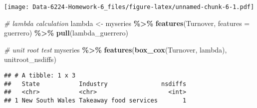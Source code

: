 \documentclass[
]{article}
\newenvironment{Shaded}{\begin{snugshade}}{\end{snugshade}}
\newcommand{\AttributeTok}[1]{\textcolor[rgb]{0.13,0.29,0.53}{#1}}
\newcommand{\CommentTok}[1]{\textcolor[rgb]{0.56,0.35,0.01}{\textit{#1}}}
\newcommand{\DecValTok}[1]{\textcolor[rgb]{0.00,0.00,0.81}{#1}}
\newcommand{\FunctionTok}[1]{\textcolor[rgb]{0.13,0.29,0.53}{\textbf{#1}}}
\newcommand{\NormalTok}[1]{#1}
\newcommand{\OtherTok}[1]{\textcolor[rgb]{0.56,0.35,0.01}{#1}}
\newcommand{\SpecialCharTok}[1]{\textcolor[rgb]{0.81,0.36,0.00}{\textbf{#1}}}
\newcommand{\StringTok}[1]{\textcolor[rgb]{0.31,0.60,0.02}{#1}}
\begin{document}
\begin{Shaded}
\end{Shaded}

\texttt{[image: Data-6224-Homework-6\_files/figure-latex/unnamed-chunk-6-1.pdf]}

\begin{Shaded}
\begin{Highlighting}[]
\CommentTok{\# lambda calculation}
\NormalTok{lambda }\OtherTok{\textless{}{-}}\NormalTok{ myseries }\SpecialCharTok{\%\textgreater{}\%}
  \FunctionTok{features}\NormalTok{(Turnover, }\AttributeTok{features =}\NormalTok{ guerrero) }\SpecialCharTok{\%\textgreater{}\%}
  \FunctionTok{pull}\NormalTok{(lambda\_guerrero)}

\CommentTok{\# unit root test}
\NormalTok{myseries }\SpecialCharTok{\%\textgreater{}\%}
  \FunctionTok{features}\NormalTok{(}\FunctionTok{box\_cox}\NormalTok{(Turnover, lambda), unitroot\_nsdiffs) }
\end{Highlighting}
\end{Shaded}

\begin{verbatim}
## # A tibble: 1 x 3
##   State           Industry               nsdiffs
##   <chr>           <chr>                    <int>
## 1 New South Wales Takeaway food services       1
\end{verbatim}
\end{document}
